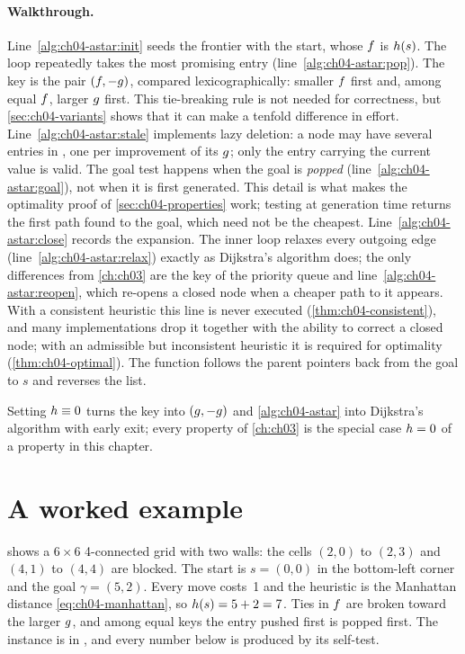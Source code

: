 \paragraph{Walkthrough.}
Line~\ref{alg:ch04-astar:init} seeds the frontier with the start, whose
$f$ is $h(s)$. The loop repeatedly takes the most promising entry
(line~\ref{alg:ch04-astar:pop}). The key is the pair $(f, -g)$, compared
lexicographically: smaller $f$ first and, among equal $f$, larger
$g$ first. This tie-breaking rule is not needed for
correctness, but \cref{sec:ch04-variants} shows that it can make a tenfold
difference in effort. Line~\ref{alg:ch04-astar:stale} implements lazy deletion:
a node may have several entries in \Open, one per improvement of its $g$;
only the entry carrying the current value is valid. The goal test happens when
the goal is \emph{popped} (line~\ref{alg:ch04-astar:goal}), not when it is first
generated. This detail is what makes the optimality proof of
\cref{sec:ch04-properties} work; testing at generation time returns the first
path found to the goal, which need not be the cheapest. Line~\ref{alg:ch04-astar:close}
records the expansion. The inner loop relaxes every outgoing edge
(line~\ref{alg:ch04-astar:relax}) exactly as Dijkstra's algorithm does; the
only differences from \cref{ch:ch03} are the key of the priority queue and
line~\ref{alg:ch04-astar:reopen}, which re-opens a closed node when a cheaper
path to it appears. With a consistent heuristic this line is never executed
(\cref{thm:ch04-consistent}), and many implementations drop it together with
the ability to correct a closed node; with an admissible but inconsistent
heuristic it is required for optimality (\cref{thm:ch04-optimal}). The
function \AstarPath follows the parent pointers back from the goal to $s$ and
reverses the list.

Setting $h \equiv 0$ turns the key into $(g, -g)$ and
\cref{alg:ch04-astar} into Dijkstra's algorithm with early exit; every property
of \cref{ch:ch03} is the special case $h = 0$ of a property in this
chapter.

\section{A worked example}
\label{sec:ch04-example}

\begin{example}
\label{ex:ch04-grid}
 shows a $6 \times 6$ 4-connected grid with two walls:
the cells $(2, 0)$ to $(2, 3)$ and $(4, 1)$ to $(4, 4)$ are blocked. The start
is $s = (0, 0)$ in the bottom-left corner and the goal $\gamma = (5, 2)$. Every
move costs~1 and the heuristic is the Manhattan distance
\cref{eq:ch04-manhattan}, so $h(s) = 5 + 2 = 7$. Ties in $f$ are
broken toward the larger $g$, and among equal keys the entry pushed first
is popped first. The instance is  in
, and every number below is produced by its self-test.
\end{example}


